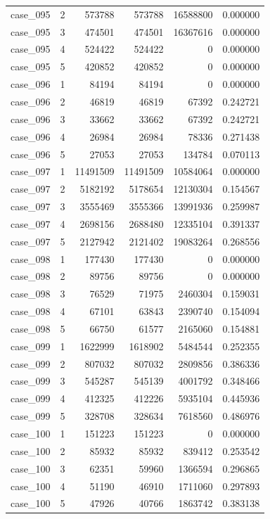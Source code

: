 \begin{longtable}{lrrrrr}
case\_095 & 2 & 573788 & 573788 & 16588800 & 0.000000 \\
case\_095 & 3 & 474501 & 474501 & 16367616 & 0.000000 \\
case\_095 & 4 & 524422 & 524422 & 0 & 0.000000 \\
case\_095 & 5 & 420852 & 420852 & 0 & 0.000000 \\
case\_096 & 1 & 84194 & 84194 & 0 & 0.000000 \\
case\_096 & 2 & 46819 & 46819 & 67392 & 0.242721 \\
case\_096 & 3 & 33662 & 33662 & 67392 & 0.242721 \\
case\_096 & 4 & 26984 & 26984 & 78336 & 0.271438 \\
case\_096 & 5 & 27053 & 27053 & 134784 & 0.070113 \\
case\_097 & 1 & 11491509 & 11491509 & 10584064 & 0.000000 \\
case\_097 & 2 & 5182192 & 5178654 & 12130304 & 0.154567 \\
case\_097 & 3 & 3555469 & 3555366 & 13991936 & 0.259987 \\
case\_097 & 4 & 2698156 & 2688480 & 12335104 & 0.391337 \\
case\_097 & 5 & 2127942 & 2121402 & 19083264 & 0.268556 \\
case\_098 & 1 & 177430 & 177430 & 0 & 0.000000 \\
case\_098 & 2 & 89756 & 89756 & 0 & 0.000000 \\
case\_098 & 3 & 76529 & 71975 & 2460304 & 0.159031 \\
case\_098 & 4 & 67101 & 63843 & 2390740 & 0.154094 \\
case\_098 & 5 & 66750 & 61577 & 2165060 & 0.154881 \\
case\_099 & 1 & 1622999 & 1618902 & 5484544 & 0.252355 \\
case\_099 & 2 & 807032 & 807032 & 2809856 & 0.386336 \\
case\_099 & 3 & 545287 & 545139 & 4001792 & 0.348466 \\
case\_099 & 4 & 412325 & 412226 & 5935104 & 0.445936 \\
case\_099 & 5 & 328708 & 328634 & 7618560 & 0.486976 \\
case\_100 & 1 & 151223 & 151223 & 0 & 0.000000 \\
case\_100 & 2 & 85932 & 85932 & 839412 & 0.253542 \\
case\_100 & 3 & 62351 & 59960 & 1366594 & 0.296865 \\
case\_100 & 4 & 51190 & 46910 & 1711060 & 0.297893 \\
case\_100 & 5 & 47926 & 40766 & 1863742 & 0.383138 \\
\end{longtable}
